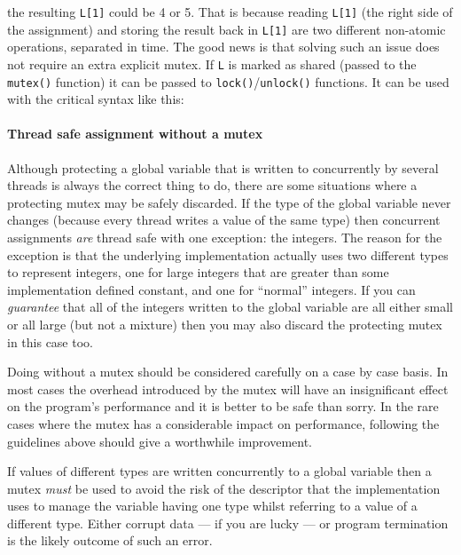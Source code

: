 
the resulting \texttt{L[1]} could be 4 or 5. That is because reading
\texttt{L[1]} (the right side of the assignment) and storing the result back in
\texttt{L[1]} are two different non-atomic operations, separated in time. The
good news is that solving such an issue does not require an extra explicit
mutex. If \texttt{L} is marked as shared (passed to the \texttt{mutex()}
function) it can be passed to \texttt{lock()}/\texttt{unlock()} functions. It
can be used with the critical syntax like this:


\paragraph{Thread safe assignment without a mutex}
\label{ThreadSafeAssignment}
Although protecting a global variable that is written to concurrently by several
threads is always the correct thing to do, there are some situations where a
protecting mutex may be safely discarded. If the type of the global variable
never changes (because every thread writes a value of the same type) then
concurrent assignments {\em are} thread safe with one exception: the
integers. The reason for the exception is that the underlying implementation
actually uses two different types to represent integers, one for large integers
that are greater than some implementation defined constant, and one for
``normal'' integers.  If you can {\em guarantee} that all of the integers
written to the global variable are all either small or all large (but not a
mixture) then you may also discard the protecting mutex in this case too.

Doing without a mutex should be considered carefully on a case by case basis.
In most cases the overhead introduced by the mutex will have an insignificant
effect on the program's performance and it is better to be safe than sorry.  
In the rare cases where the mutex has a considerable impact on performance,
following the guidelines above should give a worthwhile improvement.

If values of different types are written concurrently to a global variable then
a mutex {\em must} be used to avoid the risk of the descriptor that the
implementation uses to manage the variable having one type whilst referring to
a value of a different type. Either corrupt data --- if you are lucky --- or
program termination is the likely outcome of such an error.



